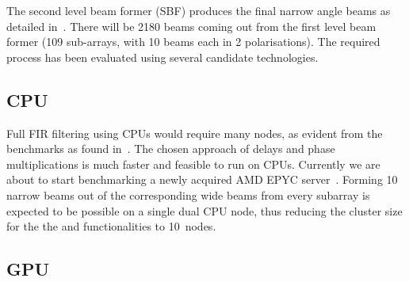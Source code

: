 \documentclass[12pt,a4paper]{article}
\begin{document}

The \ED second level beam former (SBF) produces the final narrow angle beams as detailed in~\cite{assars-note}.
There will be 2180 beams coming out from the first level beam former (109 sub-arrays, with 10 beams each in 2 polarisations).
The required process has been evaluated using several candidate technologies.
\subsection{CPU}

Full FIR filtering using CPUs would require many nodes, as evident from the benchmarks as found in~\cite{assars-note}. The chosen approach of \fsru{} delays and phase multiplications is much faster and feasible to run on CPUs.  Currently we are about to start benchmarking a newly acquired AMD EPYC server~\cite{amd-epyc}. 
Forming 10 narrow beams out of the corresponding wide beams from every subarray is expected to be possible on a single dual CPU node, thus reducing the cluster size for the the \RB{} and \SBF{} functionalities to 10~nodes.



\subsection{GPU}
\end{document}
